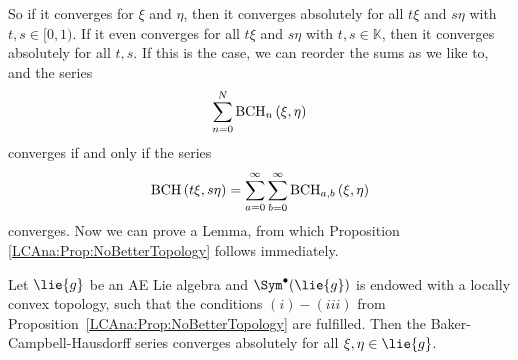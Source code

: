 So if it converges for $\xi$ and $\eta$, then it converges absolutely for all 
$t \xi$ and $s \eta$ with $t,s \in [0, 1)$. If it even converges for all $t 
\xi$ and $s \eta$ with $t, s \in \mathbb{K}$, then it converges absolutely for 
all $t, s$. If this is the case, we can reorder the sums as we like to, and the 
series
\begin{equation*}
	\sum\limits_{n = 0}^N
	\mathrm{BCH}_{n}\left(\xi, \eta\right)
\end{equation*}
converges if and only if the series
\begin{equation*}
	\mathrm{BCH}\left(t \xi, s \eta\right)
	=
	\sum\limits_{a = 0}^{\infty}
	\sum\limits_{b = 0}^{\infty}
	\mathrm{BCH}_{a, b}\left(\xi, \eta\right)
\end{equation*}
converges. Now we can prove a Lemma, from which Proposition 
\ref{LCAna:Prop:NoBetterTopology} follows immediately.
\begin{lemma}
	Let $\lie{g}$ be an AE Lie algebra and $\Sym^{\bullet}(\lie{g})$ is 
	endowed with a locally convex topology, such that the conditions $(i) - 
	(iii)$ from Proposition~\ref{LCAna:Prop:NoBetterTopology} are fulfilled. 
	Then the Baker-Campbell-Hausdorff series converges absolutely for all 
	$\xi, \eta \in \lie{g}$.
\end{lemma}
